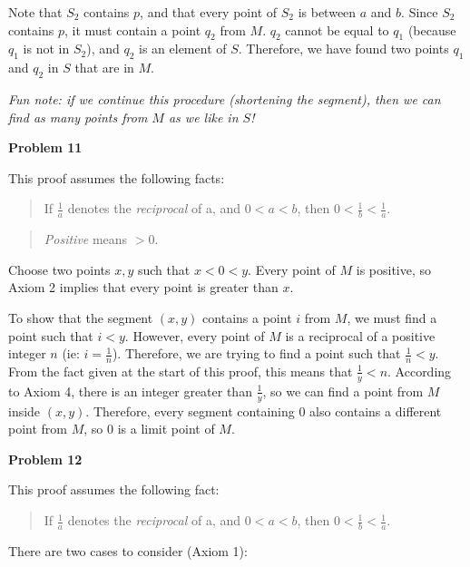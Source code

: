 \documentclass{article}
\begin{document}
Note that $S_2$ contains $p$, and that every point of $S_2$ is between $a$ and $b$. Since $S_2$ contains $p$, it must contain a point $q_2$ from $M$. $q_2$ cannot be equal to $q_1$ (because $q_1$ is not in $S_2$), and $q_2$ is an element of $S$. Therefore, we have found two points $q_1$ and $q_2$ in $S$ that are in $M$.

\textit{Fun note: if we continue this procedure (shortening the segment), then we can find as many points from $M$ as we like in $S$!}
\vspace{10pt}


\textbf{Problem 11}

This proof assumes the following facts:

\begin{quote}
If $\frac{1}{a}$ denotes the \textit{reciprocal} of a, and $0 < a < b$, then $0 < \frac{1}{b} < \frac{1}{a}$.
\end{quote}

\begin{quote}
\textit{Positive} means $ > 0$.
\end{quote}

Choose two points $x, y$ such that $x < 0 < y$. Every point of $M$ is positive, so Axiom 2 implies that every point is greater than $x$. 

To show that the segment $(x, y)$ contains a point $i$ from $M$, we must find a point such that $i < y$. However, every point of $M$ is a reciprocal of a positive integer $n$ (ie: $i = \frac{1}{n}$). Therefore, we are trying to find a point such that $\frac{1}{n} < y$. From the fact given at the start of this proof, this means that $\frac{1}{y} < n$. According to Axiom 4, there is an integer greater than $\frac{1}{y}$, so we can find a point from $M$ inside $(x, y)$. Therefore, every segment containing $0$ also contains a different point from $M$, so $0$ is a limit point of $M$.
\vspace{10pt}

\textbf{Problem 12}

This proof assumes the following fact:

\begin{quote}
If $\frac{1}{a}$ denotes the \textit{reciprocal} of a, and $0 < a < b$, then $0 < \frac{1}{b} < \frac{1}{a}$.
\end{quote}

There are two cases to consider (Axiom 1):
\end{document}
